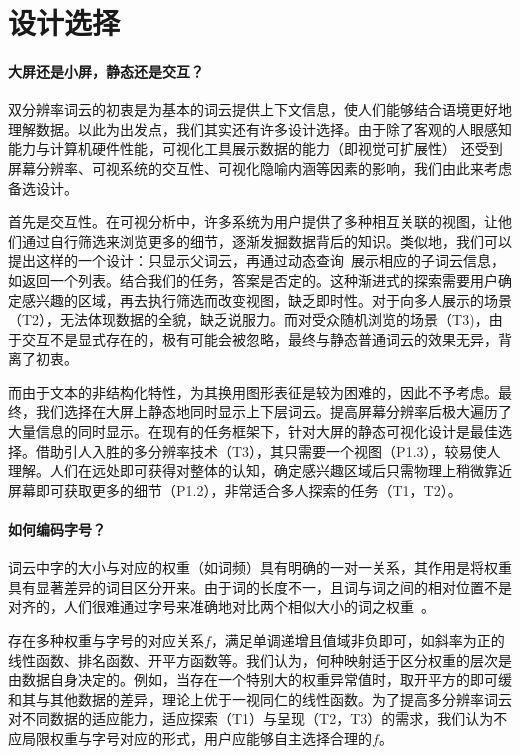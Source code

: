\section{设计选择}
\paragraph{大屏还是小屏，静态还是交互？}
双分辨率词云的初衷是为基本的词云提供上下文信息，使人们能够结合语境更好地理解数据。以此为出发点，我们其实还有许多设计选择。由于除了客观的人眼感知能力与计算机硬件性能，可视化工具展示数据的能力（即视觉可扩展性\supercite{Eick2002}） 还受到屏幕分辨率、可视系统的交互性、可视化隐喻内涵等因素的影响，我们由此来考虑备选设计。

首先是交互性。在可视分析中，许多系统为用户提供了多种相互关联的视图，让他们通过自行筛选来浏览更多的细节，逐渐发掘数据背后的知识。类似地，我们可以提出这样的一个设计：只显示父词云，再通过动态查询~\supercite{DBLP:journals/software/Schneiderman94}展示相应的子词云信息，如返回一个列表。结合我们的任务，答案是否定的。这种渐进式的探索需要用户确定感兴趣的区域，再去执行筛选而改变视图，缺乏即时性。对于向多人展示的场景（T2），无法体现数据的全貌，缺乏说服力。而对受众随机浏览的场景（T3)，由于交互不是显式存在的，极有可能会被忽略，最终与静态普通词云的效果无异，背离了初衷。

而由于文本的非结构化特性，为其换用图形表征是较为困难的，因此不予考虑。最终，我们选择在大屏上静态地同时显示上下层词云。提高屏幕分辨率后极大遍历了大量信息的同时显示。在现有的任务框架下，针对大屏的静态可视化设计是最佳选择。借助引人入胜的多分辨率技术（T3），其只需要一个视图（P1.3），较易使人理解。人们在远处即可获得对整体的认知，确定感兴趣区域后只需物理上稍微靠近屏幕即可获取更多的细节（P1.2），非常适合多人探索的任务（T1，T2）。


\paragraph {如何编码字号？}

词云中字的大小与对应的权重（如词频）具有明确的一对一关系，其作用是将权重具有显著差异的词目区分开来。由于词的长度不一，且词与词之间的相对位置不是对齐的，人们很难通过字号来准确地对比两个相似大小的词之权重~\supercite{Johann2009}。

存在多种权重与字号的对应关系$f$，满足单调递增且值域非负即可，如斜率为正的线性函数、排名函数、开平方函数等。我们认为，何种映射适于区分权重的层次是由数据自身决定的。例如，当存在一个特别大的权重异常值时，取开平方的即可缓和其与其他数据的差异，理论上优于一视同仁的线性函数。为了提高多分辨率词云对不同数据的适应能力，适应探索（T1）与呈现（T2，T3）的需求，我们认为不应局限权重与字号对应的形式，用户应能够自主选择合理的$f$。

